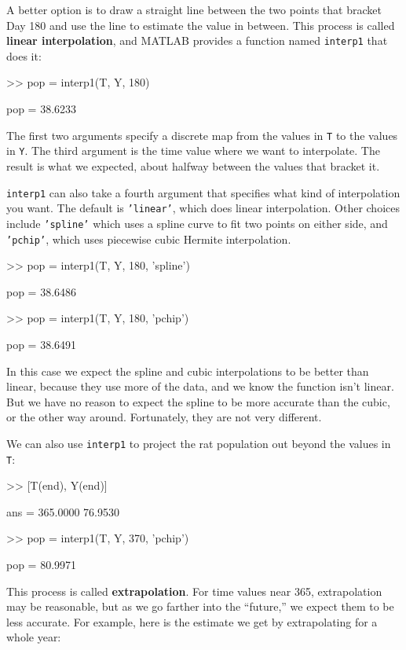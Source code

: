 \documentclass[
]{book}
\numberwithin{Answer}{chapter}
\numberwithin{Exercise}{chapter}
\begin{document}
A better option is to draw a straight line between the two points that
bracket Day 180 and use the line to estimate the value in between.
This process is called {\bf linear interpolation}, and MATLAB provides
a function named {\tt interp1} that does it:

\begin{code}
>> pop = interp1(T, Y, 180)

pop = 38.6233
\end{code}

The first two arguments specify a discrete map from the values in
{\tt T} to the values in {\tt Y}.  The third argument is the
time value where we want to interpolate.  The result is what
we expected, about halfway between the values that bracket it.

{\tt interp1} can also take a fourth argument that specifies what
kind of interpolation you want.  The default is {\tt 'linear'}, which
does linear interpolation.  Other choices include {\tt 'spline'}
which uses a spline curve to fit two points on either side,
and {\tt 'pchip'}, which uses piecewise cubic Hermite interpolation.

\begin{code}
>> pop = interp1(T, Y, 180, 'spline')

pop = 38.6486

>> pop = interp1(T, Y, 180, 'pchip')

pop = 38.6491
\end{code}

In this case we expect the spline and cubic interpolations to be
better than linear, because they use more of the data, and we know the
function isn't linear.  But we have no reason to expect the spline to
be more accurate than the cubic, or the other way around.
Fortunately, they are not very different.

We can also use {\tt interp1} to project the rat population out
beyond the values in {\tt T}:

\begin{code}
>> [T(end), Y(end)]

ans = 365.0000   76.9530

>> pop = interp1(T, Y, 370, 'pchip')

pop = 80.9971
\end{code}

This process is called {\bf extrapolation}.  For time values near
365, extrapolation may be reasonable, but as we go farther into
the ``future,'' we expect them to be less accurate.
For example, here is the estimate we get by extrapolating for a whole
year:
\end{document}
